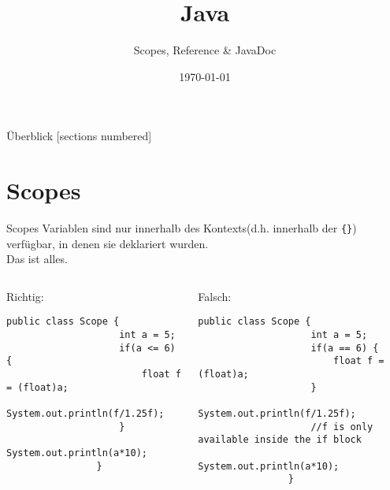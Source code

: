 

\usepackage{csquotes}
\usepackage{tikz}
\usepackage{tikz-qtree}

\title{Java}
\subtitle{Scopes, Reference \& JavaDoc}
\date{\today}



\begin{frame}
\titlepage
\end{frame}

\begin{frame}{Überblick}
    [sections numbered]
    \tableofcontents
\end{frame}

\section{Scopes}

\begin{frame}[fragile]{Scopes}
    \center
    \large{Variablen sind nur innerhalb des Kontexts(d.h. innerhalb der \texttt{\{\}}) verfügbar, in denen sie deklariert wurden. \\
    \pause
    Das ist alles.}
    \pause
    \begin{columns}[T]
        \begin{column}{.5\textwidth}
            Richtig:
            \begin{lstlisting}[gobble=16]
                public class Scope {
                    int a = 5;
                    if(a <= 6) {
                        float f = (float)a;
                        System.out.println(f/1.25f);
                    }
                    System.out.println(a*10);
                }
            \end{lstlisting}
        \end{column}
        \begin{column}{.5\textwidth}
            Falsch:
            \begin{lstlisting}[gobble=16]
                public class Scope {
                    int a = 5;
                    if(a == 6) {
                        float f = (float)a;
                    }
                    System.out.println(f/1.25f);
                    //f is only available inside the if block
                    System.out.println(a*10);
                }
            \end{lstlisting}
        \end{column}
    \end{columns}
\end{frame}

